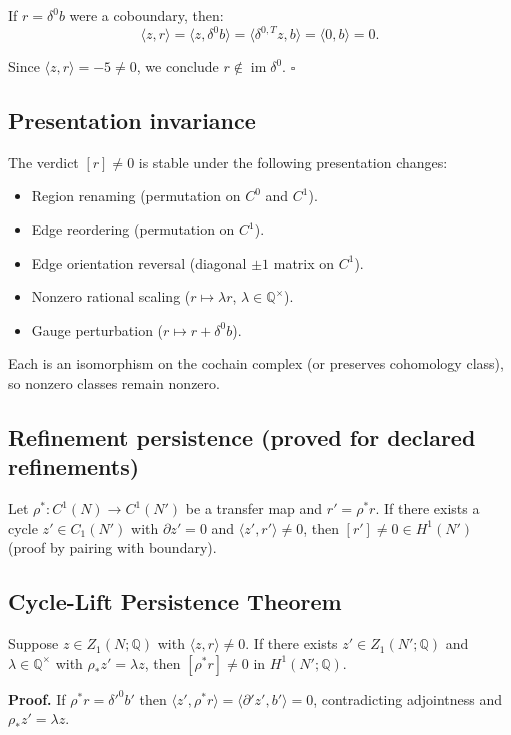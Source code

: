 If $r = \delta^0 b$ were a coboundary, then:
\[
\langle z, r \rangle = \langle z, \delta^0 b \rangle = \langle \delta^{0,T} z, b \rangle = \langle 0, b \rangle = 0.
\]

Since $\langle z, r \rangle = -5 \neq 0$, we conclude $r \notin \operatorname{im}\delta^0$. $\square$

\subsection{Presentation invariance}
The verdict $[r] \neq 0$ is stable under the following presentation changes:
\begin{itemize}
\item Region renaming (permutation on $C^0$ and $C^1$).
\item Edge reordering (permutation on $C^1$).
\item Edge orientation reversal (diagonal $\pm1$ matrix on $C^1$).
\item Nonzero rational scaling ($r\mapsto\lambda r$, $\lambda\in\mathbb{Q}^\times$).
\item Gauge perturbation ($r\mapsto r+\delta^0 b$).
\end{itemize}

Each is an isomorphism on the cochain complex (or preserves cohomology class), so nonzero classes remain nonzero.

\subsection{Refinement persistence (proved for declared refinements)}
Let $\rho^*:C^1(N)\to C^1(N')$ be a transfer map and $r' = \rho^* r$. If there exists a cycle $z' \in C_1(N')$ with $\partial z' = 0$ and $\langle z', r' \rangle \neq 0$, then $[r'] \neq 0 \in H^1(N')$ (proof by pairing with boundary).

\subsection{Cycle-Lift Persistence Theorem}
Suppose $z \in Z_1(N;\mathbb{Q})$ with $\langle z, r \rangle \neq 0$. If there exists $z'\in Z_1(N';\mathbb{Q})$ and $\lambda\in\mathbb{Q}^\times$ with $\rho_* z' = \lambda z$, then $[\rho^* r]\neq0$ in $H^1(N';\mathbb{Q})$.

\textbf{Proof.} If $\rho^* r = \delta'^0 b'$ then $\langle z', \rho^* r\rangle = \langle \partial' z', b'\rangle = 0$, contradicting adjointness and $\rho_* z' = \lambda z$.

